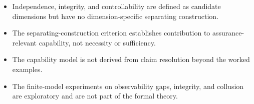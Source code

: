 \begin{itemize}
  \item Independence, integrity, and controllability are defined as candidate dimensions
        but have no dimension-specific separating construction.
  \item The separating-construction criterion establishes contribution to assurance-relevant capability,
        not necessity or sufficiency.
  \item The capability model is not derived from claim resolution beyond the worked examples.
  \item The finite-model experiments on observability gaps, integrity, and collusion are exploratory
        and are not part of the formal theory.
\end{itemize}
